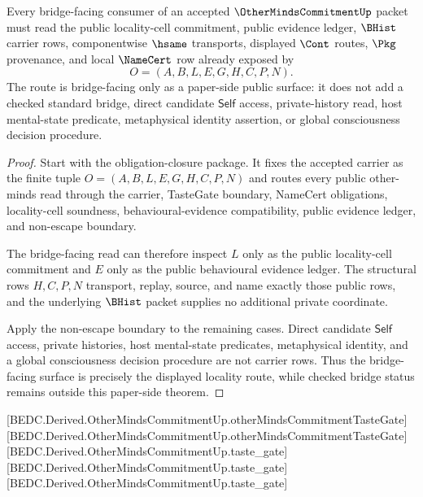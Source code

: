 \begin{theorem}
\label{thm:other-minds-commitment-bridge-facing-locality-route}
Every bridge-facing consumer of an accepted $\OtherMindsCommitmentUp$ packet must read the public locality-cell commitment, public evidence ledger, $\BHist$ carrier rows, componentwise $\hsame$ transports, displayed $\Cont$ routes, $\Pkg$ provenance, and local $\NameCert$ row already exposed by
$$
O=(A,B,L,E,G,H,C,P,N).
$$
The route is bridge-facing only as a paper-side public surface: it does not add a checked standard bridge, direct candidate $\mathsf{Self}$ access, private-history read, host mental-state predicate, metaphysical identity assertion, or global consciousness decision procedure.
\end{theorem}
\begin{proof}
Start with the obligation-closure package. It fixes the accepted carrier as the finite tuple $O=(A,B,L,E,G,H,C,P,N)$ and routes every public other-minds read through the carrier, TasteGate boundary, NameCert obligations, locality-cell soundness, behavioural-evidence compatibility, public evidence ledger, and non-escape boundary.

The bridge-facing read can therefore inspect $L$ only as the public locality-cell commitment and $E$ only as the public behavioural evidence ledger. The structural rows $H,C,P,N$ transport, replay, source, and name exactly those public rows, and the underlying $\BHist$ packet supplies no additional private coordinate.

Apply the non-escape boundary to the remaining cases. Direct candidate $\mathsf{Self}$ access, private histories, host mental-state predicates, metaphysical identity, and a global consciousness decision procedure are not carrier rows. Thus the bridge-facing surface is precisely the displayed locality route, while checked bridge status remains outside this paper-side theorem.
\end{proof}

[BEDC.Derived.OtherMindsCommitmentUp.otherMindsCommitmentTasteGate]
[BEDC.Derived.OtherMindsCommitmentUp.otherMindsCommitmentTasteGate]
[BEDC.Derived.OtherMindsCommitmentUp.taste\_gate]
[BEDC.Derived.OtherMindsCommitmentUp.taste\_gate]
[BEDC.Derived.OtherMindsCommitmentUp.taste\_gate]


